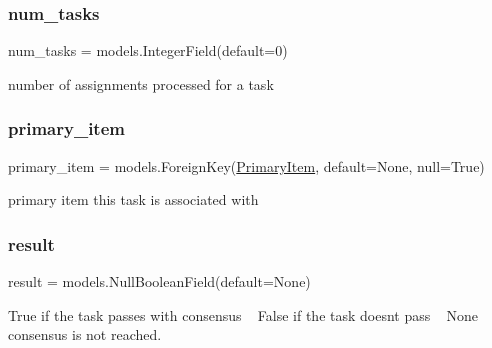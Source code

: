 \subsubsection{\texorpdfstring{num\_tasks}{num\_tasks}}
{\footnotesize\ttfamily num\+\_\+tasks = models.\+Integer\+Field(default=0)\hspace{0.3cm}{\ttfamily [static]}}



number of assignments processed for a task 

\mbox{\label{classjoinapp_1_1models_1_1task__management__models_1_1_j_f_task_aba1ada8f72cc448a543f1b01551172fa}} 
\subsubsection{\texorpdfstring{primary\_item}{primary\_item}}
{\footnotesize\ttfamily primary\+\_\+item = models.\+Foreign\+Key(\textquotesingle{}\mbox{\hyperlink{classjoinapp_1_1models_1_1items_1_1_primary_item}{Primary\+Item}}\textquotesingle{}, default=None, null=True)\hspace{0.3cm}{\ttfamily [static]}}



primary item this task is associated with 

\mbox{\label{classjoinapp_1_1models_1_1task__management__models_1_1_j_f_task_a937d4dd628a8858b443a399410d2600b}} 
\subsubsection{\texorpdfstring{result}{result}}
{\footnotesize\ttfamily result = models.\+Null\+Boolean\+Field(default=None)\hspace{0.3cm}{\ttfamily [static]}}



True if the task passes with consensus ~\newline
 False if the task doesn\textquotesingle{}t pass ~\newline
 None consensus is not reached. 

\mbox{\label{classjoinapp_1_1models_1_1task__management__models_1_1_j_f_task_a70c092a6aebace0b1ea406e14da78a40}} 
